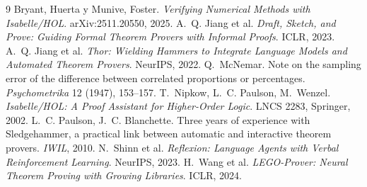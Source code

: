 \documentclass[11pt]{article}
\theoremstyle{remark}
\newcommand{\1}{\mathbb{1}}
\begin{document}
\begin{thebibliography}{9}\small
{} Bryant, Huerta y Munive, Foster. \emph{Verifying Numerical Methods with Isabelle/HOL}. arXiv:2511.20550, 2025.
 A.~Q. Jiang et al. \emph{Draft, Sketch, and Prove: Guiding Formal Theorem Provers with Informal Proofs}. ICLR, 2023.
 A.~Q. Jiang et al. \emph{Thor: Wielding Hammers to Integrate Language Models and Automated Theorem Provers}. NeurIPS, 2022.
 Q.~McNemar. Note on the sampling error of the difference between correlated proportions or percentages. \emph{Psychometrika} 12 (1947), 153--157.
 T.~Nipkow, L.~C. Paulson, M.~Wenzel. \emph{Isabelle/HOL: A Proof Assistant for Higher-Order Logic}. LNCS 2283, Springer, 2002.
 L.~C. Paulson, J.~C. Blanchette. Three years of experience with Sledgehammer, a practical link between automatic and interactive theorem provers. \emph{IWIL}, 2010.
 N.~Shinn et al. \emph{Reflexion: Language Agents with Verbal Reinforcement Learning}. NeurIPS, 2023.
 H.~Wang et al. \emph{LEGO-Prover: Neural Theorem Proving with Growing Libraries}. ICLR, 2024.
\end{thebibliography}
\end{document}
